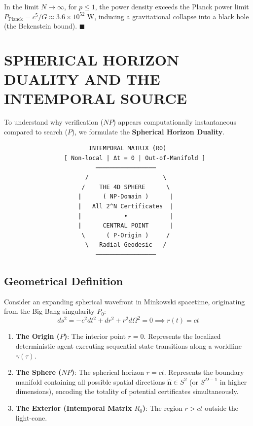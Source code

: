 \documentclass[10pt,twocolumn]{article}
\begin{document}
In the limit $N \to \infty$, for $p \le 1$, the power density exceeds the Planck power limit $P_{\text{Planck}} = c^5 / G \approx 3.6 \times 10^{52}\text{ W}$, inducing a gravitational collapse into a black hole (the Bekenstein bound). $\blacksquare$



\section{SPHERICAL HORIZON DUALITY AND THE INTEMPORAL SOURCE}

To understand why verification ($NP$) appears computationally instantaneous compared to search ($P$), we formulate the \textbf{Spherical Horizon Duality}.

\begin{verbatim}
                        INTEMPORAL MATRIX (R0)
                 [ Non-local | Δt = 0 | Out-of-Manifold ]
                          ─────────────────
                       /                     \
                      /    THE 4D SPHERE      \
                     |      ( NP-Domain )      |
                     |   All 2^N Certificates  |
                     |            •            |
                     |      CENTRAL POINT      |
                      \      ( P-Origin )     /
                       \   Radial Geodesic   /
                          ─────────────────
\end{verbatim}


\subsection{Geometrical Definition}

Consider an expanding spherical wavefront in Minkowski spacetime, originating from the Big Bang singularity $P_0$:
\begin{equation}
  ds^2 = -c^2 dt^2 + dr^2 + r^2 d\Omega^2 = 0 \implies r(t) = ct
\end{equation}

\begin{enumerate}
  \item \textbf{The Origin ($P$)}: The interior point $r = 0$. Represents the localized deterministic agent executing sequential state transitions along a worldline $\gamma(\tau)$.
  \item \textbf{The Sphere ($NP$)}: The spherical horizon $r = ct$. Represents the boundary manifold containing all possible spatial directions $\mathbf{\hat{n}} \in S^2$ (or $S^{D-1}$ in higher dimensions), encoding the totality of potential certificates simultaneously.
  \item \textbf{The Exterior (Intemporal Matrix $R_0$)}: The region $r > ct$ outside the light-cone.
\end{enumerate}
\end{document}
